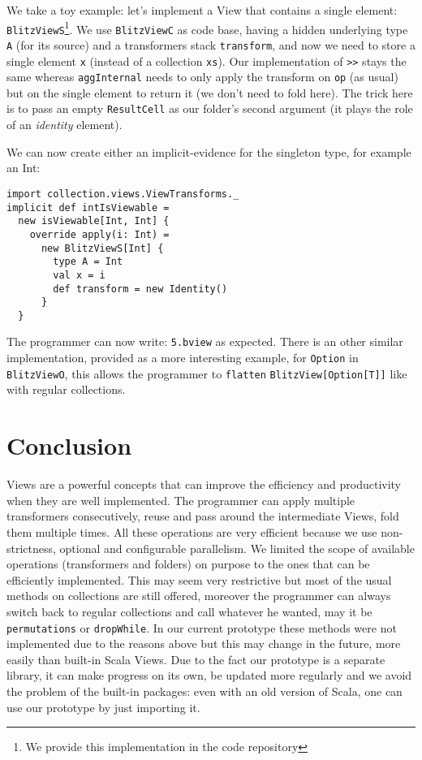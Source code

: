 \documentclass[a4paper,12pt,twocolumn]{article}
\begin{document}
We take a toy example: let's implement a View that contains a single element: \verb|BlitzViewS|\footnote{We provide this implementation in the code repository}.
We use \verb|BlitzViewC| as code base, having a hidden underlying type \verb|A| (for its source) and a transformers stack \verb|transform|, and now we need to store a single element \verb|x| (instead of a collection \verb|xs|).
Our implementation of \verb|>>| stays the same whereas \verb|aggInternal| needs to only apply the transform on \verb|op| (as usual) but on the single element to return it (we don't need to fold here).
The trick here is to pass an empty \verb|ResultCell| as our folder's second argument (it plays the role of an {\it identity}\/ element).

We can now create either an implicit-evidence for the singleton type, for example an Int:
\begin{lstlisting}
import collection.views.ViewTransforms._
implicit def intIsViewable =
  new isViewable[Int, Int] {
    override apply(i: Int) =
      new BlitzViewS[Int] {
        type A = Int
        val x = i
        def transform = new Identity()
      }
  }
\end{lstlisting}
The programmer can now write: \verb|5.bview| as expected.
There is an other similar implementation, provided as a more interesting example, for \verb|Option| in \verb|BlitzViewO|, this allows the programmer to \verb|flatten| \verb|BlitzView[Option[T]]| like with regular collections.

\section{Conclusion}
Views are a powerful concepts that can improve the efficiency and productivity when they are well implemented.
The programmer can apply multiple transformers consecutively, reuse and pass around the intermediate Views, fold them multiple times.
All these operations are very efficient because we use non-strictness, optional and configurable parallelism.
We limited the scope of available operations (transformers and folders) on purpose to the ones that can be efficiently implemented.
This may seem very restrictive but most of the usual methods on collections are still offered, moreover the programmer can always switch back to regular collections and call whatever he wanted, may it be \verb|permutations| or \verb|dropWhile|.
In our current prototype these methods were not implemented due to the reasons above but this may change in the future, more easily than built-in Scala Views.
Due to the fact our prototype is a separate library, it can make progress on its own, be updated more regularly and we avoid the problem of the built-in packages: even with an old version of Scala, one can use our prototype by just importing it.
\end{document}
